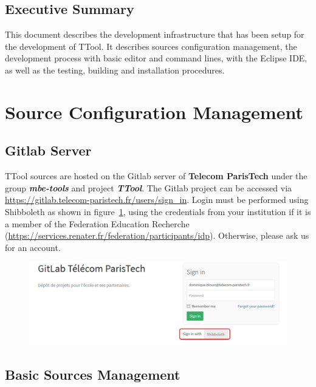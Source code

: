 \documentclass[12pt]{article}
\begin{document}
\subsection{Executive Summary}

This document describes the development infrastructure that has been setup for
the development of TTool. It describes sources configuration management, the
development process with basic editor and command lines, with the Eclipse IDE,
as well as the testing, building and installation procedures.

\newpage 

\section{Source Configuration Management}
\label{sec:scm}

\subsection{Gitlab Server}

TTool sources are hosted on the Gitlab server of \textbf{Telecom ParisTech} under the
group \textbf{\textit{mbe}\textit{-tools}} and project \textbf{\textit{TTool}}. The Gitlab project
can be accessed via \url{https://gitlab.telecom-paristech.fr/users/sign_in}. 
Login must be performed using Shibboleth as shown in
figure~\ref{fig:image1}, using the credentials from your institution if it is a
member of the Federation Education Recherche (\url{https://services.renater.fr/federation/participants/idp}). Otherwise, please ask us for an account.

\begin{figure}[H]
\begin{center}
\includegraphics[width=\textwidth]{images/image2.png}
\end{center}
\caption{}
\label{fig:image1}
\end{figure}
 
\subsection{Basic Sources Management}
\end{document}

